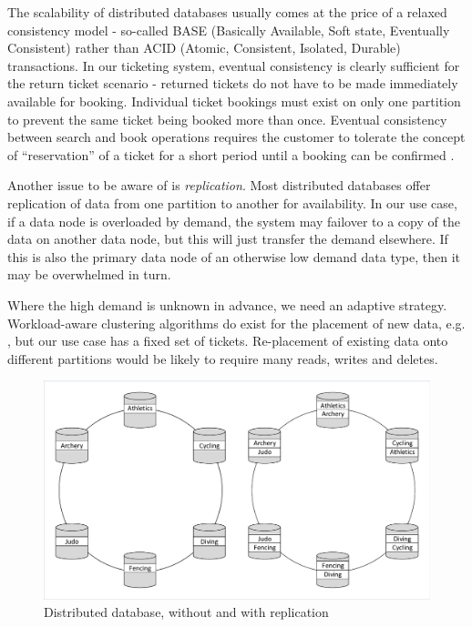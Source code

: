 The scalability of distributed databases usually comes at the price of a relaxed consistency model - so-called BASE (Basically Available, Soft state, Eventually Consistent) rather than ACID (Atomic, Consistent, Isolated, Durable) transactions.  In our ticketing system, eventual consistency is clearly sufficient for the return ticket scenario - returned tickets do not have to be made immediately available for booking.  Individual ticket bookings must exist on only one partition to prevent the same ticket being booked more than once.  Eventual consistency between search and book operations requires the customer to tolerate the concept of ``reservation'' of a ticket for a short period until a booking can be confirmed \cite{microservicesdata}\cite{cattell2011scalable}.

Another issue to be aware of is {\itshape replication}.   Most distributed databases offer replication of data from one partition to another for availability.  In our use case, if a data node is overloaded by demand, the system may failover to a copy of the data on another data node, but this will just transfer the demand elsewhere.  If this is also the primary data node of an otherwise low demand data type, then it may be overwhelmed in turn.

Where the high demand is unknown in advance, we need an adaptive strategy.  Workload-aware clustering algorithms do exist for the placement of new data, e.g. \cite{kamal2016workload}, but our use case has a fixed set of tickets.  Re-placement of existing data onto different partitions would be likely to require many reads, writes and deletes.

\begin{figure}
\caption{Distributed database, without and with replication}
\centering
\includegraphics[trim = 5 5 5 5, clip, width=\textwidth]{img/dbdist}
\end{figure}

